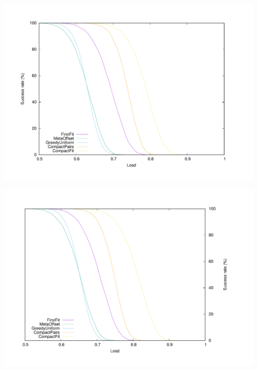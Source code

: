 \documentclass[a4paper,cleveref, autoref, thm-restate,UKenglish]{lipics-v2019}
\begin{document}
\begin{minipage}[c]{.49\linewidth}

\begin{center}
\includegraphics[scale=0.275]{100messBig}

\label{fig:100messBig}
\end{center} 
\end{minipage}
\begin{minipage}[c]{.45\linewidth}
\begin{center}  
\includegraphics[scale=0.275]{100messSmall}
\label{fig:100messSmall}
\end{center}
\end{minipage}
\end{document}
